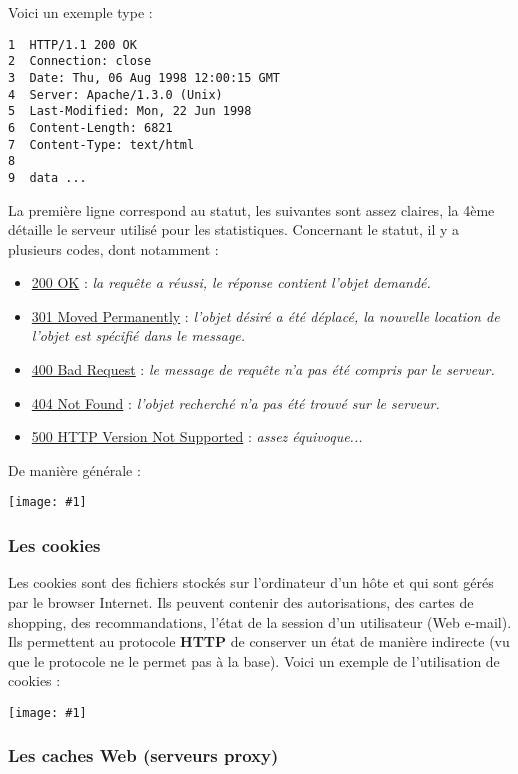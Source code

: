 \documentclass{article}
\newcommand{\ora}[1]{\textcolor{darko}{#1}}
\newcommand{\imgR}[2]{\begin{center}\texttt{[image: \#1]}\end{center}}
\newcommand{\point}[2]{\item \ora{\underline{#1}} : \textit{#2}}
\begin{document}
\noindent Voici un exemple type : 
\begin{lstlisting}
1  HTTP/1.1 200 OK
2  Connection: close
3  Date: Thu, 06 Aug 1998 12:00:15 GMT
4  Server: Apache/1.3.0 (Unix)
5  Last-Modified: Mon, 22 Jun 1998
6  Content-Length: 6821
7  Content-Type: text/html
8
9  data ...
\end{lstlisting}

\noindent La première ligne correspond au statut, les suivantes sont assez claires, la 4ème détaille le serveur 
utilisé pour les statistiques. Concernant le statut, il y a plusieurs codes, dont notamment :
\begin{itemize}
\point{200 OK}{la requête a réussi, le réponse contient l'objet demandé.}
\point{301 Moved Permanently}{l'objet désiré a été déplacé, la nouvelle location de l'objet est spécifié dans
le message.}
\point{400 Bad Request}{le message de requête n'a pas été compris par le serveur.}
\point{404 Not Found}{l'objet recherché n'a pas été trouvé sur le serveur.}
\point{500 HTTP Version Not Supported}{assez équivoque...} \\
\end{itemize}

\noindent De manière générale :

\imgR{CN_017.png}{300}

\subsubsection{Les cookies}

Les cookies sont des fichiers stockés sur l'ordinateur d'un hôte et qui sont gérés par le browser Internet. Ils
peuvent contenir des autorisations, des cartes de shopping, des recommandations, l'état de la session d'un 
utilisateur (Web e-mail). Ils permettent au protocole \textbf{HTTP} de conserver un état de manière indirecte 
(vu que le protocole ne le permet pas à la base). Voici un exemple de l'utilisation de cookies :

\imgR{CN_018.png}{300}

\subsubsection{Les caches Web (serveurs proxy)}
\end{document}
